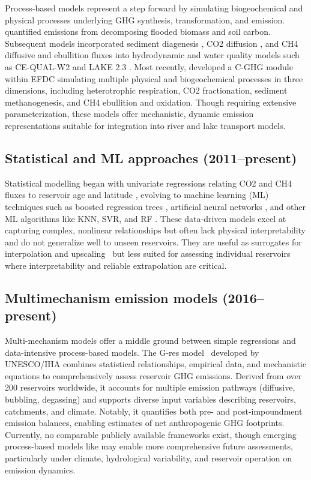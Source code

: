 \documentclass[final,1p,times]{elsarticle}
\begin{document}
Process-based models represent a step forward by simulating biogeochemical and physical processes underlying \ac{GHG} synthesis, transformation, and emission. 
\citet{Tremblay2004} quantified emissions from decomposing flooded biomass and soil carbon. 
Subsequent models incorporated sediment diagenesis \cite{Berger2014}, \ac{CO2} diffusion \cite{Wu2022}, and \ac{CH4} diffusive and ebullition fluxes \citep{Lomov2024} into hydrodynamic and water quality models such as CE-QUAL-W2 \citep{Berger2014, Wu2022} and LAKE 2.3 \citep{Lomov2024}. 
Most recently, \citet{SHI2025} developed a C-GHG module within \ac{EFDC} \cite{hamrick1992} simulating multiple physical and biogeochemical processes in three dimensions, including heterotrophic respiration, \ac{CO2} fractionation, sediment methanogenesis, and \ac{CH4} ebullition and oxidation. 
Though requiring extensive parameterization, these models offer mechanistic, dynamic emission representations suitable for integration into river and lake transport models.

\subsection{Statistical and \ac{ML} approaches (2011--present)}

Statistical modelling began with univariate regressions relating \ac{CO2} and \ac{CH4} fluxes to reservoir age and latitude \cite{Barros2011}, evolving to machine learning (ML) techniques such as boosted regression trees \cite{Beaulieu2020b}, artificial neural networks \cite{Yang2018, chen2018}, and other ML algorithms like \ac{KNN}, \ac{SVR}, and \ac{RF} \cite{WANG2025123441}. 
These data-driven models excel at capturing complex, nonlinear relationships but often lack physical interpretability and do not generalize well to unseen reservoirs. 
They are useful as surrogates for interpolation and upscaling~\cite{Beaulieu2020b} but less suited for assessing individual reservoirs where interpretability and reliable extrapolation are critical.

\subsection{Multimechanism emission models (2016--present)}
\label{sec:multimechanism_models}

Multi-mechanism models offer a middle ground between simple regressions and data-intensive process-based models. 
The G-res model~\cite{Prairie2017b, Prairie2021} developed by UNESCO/IHA combines statistical relationships, empirical data, and mechanistic equations to comprehensively assess reservoir \ac{GHG} emissions. 
Derived from over 200 reservoirs worldwide, it accounts for multiple emission pathways (diffusive, bubbling, degassing) and supports diverse input variables describing reservoirs, catchments, and climate. 
Notably, it quantifies both pre- and post-impoundment emission balances, enabling estimates of net anthropogenic \ac{GHG} footprints.
Currently, no comparable publicly available frameworks exist, though emerging process-based models like \citet{SHI2025} may enable more comprehensive future assessments, particularly under climate, hydrological variability, and reservoir operation on emission dynamics.
\end{document}
